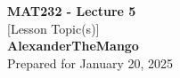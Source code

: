 \begin{titlepage}
    \null %
    \vfill
    \begin{center}
        {\fontsize{40}{48}\selectfont \bfseries MAT232 - Lecture 5}
        \vspace{20pt} \\
        {\LARGE [Lesson Topic(s)]} \\
        \vspace{20pt}
        \textbf{AlexanderTheMango}
        \vspace{8pt}
        \\ Prepared for January 20, 2025
    \end{center}
    \vfill
\end{titlepage}
